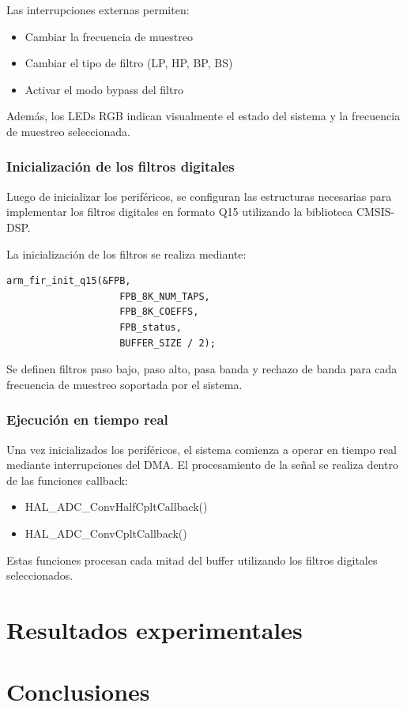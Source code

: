 \documentclass[12pt]{article}
\begin{document}
	Las interrupciones externas permiten:

	\begin{itemize}
	\item Cambiar la frecuencia de muestreo
	\item Cambiar el tipo de filtro (LP, HP, BP, BS)
	\item Activar el modo bypass del filtro
	\end{itemize}

	Además, los LEDs RGB indican visualmente el estado del sistema y la frecuencia de muestreo seleccionada.

	\subsubsection{Inicialización de los filtros digitales}
	Luego de inicializar los periféricos, se configuran las estructuras necesarias para implementar los filtros digitales en formato Q15 utilizando la biblioteca CMSIS-DSP.

	La inicialización de los filtros se realiza mediante:

	\begin{lstlisting}[style=mystyle]
	arm_fir_init_q15(&FPB,
					FPB_8K_NUM_TAPS,
					FPB_8K_COEFFS,
					FPB_status,
					BUFFER_SIZE / 2);
	\end{lstlisting}

	Se definen filtros paso bajo, paso alto, pasa banda y rechazo de banda para cada frecuencia de muestreo soportada por el sistema.

	\subsubsection{Ejecución en tiempo real}
	Una vez inicializados los periféricos, el sistema comienza a operar en tiempo real mediante interrupciones del DMA. El procesamiento de la señal se realiza dentro de las funciones callback:

	\begin{itemize}
	\item HAL\_ADC\_ConvHalfCpltCallback()
	\item HAL\_ADC\_ConvCpltCallback()
	\end{itemize}

	Estas funciones procesan cada mitad del buffer utilizando los filtros digitales seleccionados.
	
	\section{Resultados experimentales}

	
	\section{Conclusiones}

\end{document}
